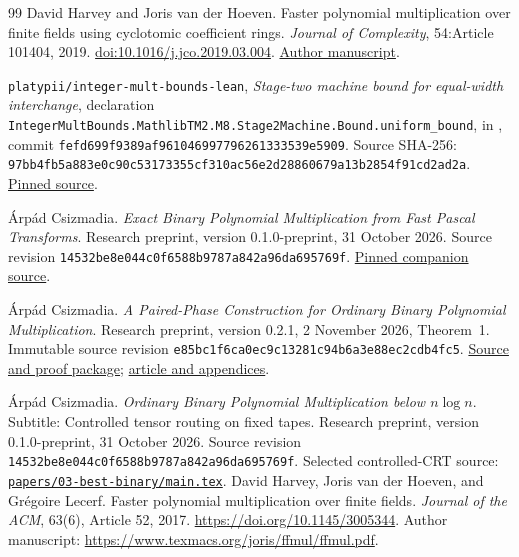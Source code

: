 \documentclass[11pt]{article}
\theoremstyle{definition}
\begin{document}
\begingroup
\small
\raggedright
\begin{thebibliography}{99}
\setlength{\itemsep}{1.5pt}
\setlength{\parsep}{0pt}
David Harvey and Joris van der Hoeven.
\newblock Faster polynomial multiplication over finite fields using
cyclotomic coefficient rings.
\newblock \emph{Journal of Complexity}, 54:Article 101404, 2019.
\newblock \href{https://doi.org/10.1016/j.jco.2019.03.004}{doi:10.1016/j.jco.2019.03.004}.
\newblock \href{https://www.texmacs.org/joris/cyclomult/cyclomult.pdf}{Author manuscript}.

\newblock \texttt{platypii/integer-mult-bounds-lean},
\emph{Stage-two machine bound for equal-width interchange}, declaration
\texttt{IntegerMultBounds.MathlibTM2.M8.Stage2Machine.Bound.uniform\_bound},
in ,
commit \texttt{fefd699f9389af961046997796261333539e5909}.
\newblock Source SHA-256: \texttt{97bb4fb5a883e0c90c53173355cf310ac56e2d28860679a13b2854f91cd2ad2a}.
\newblock \href{https://github.com/platypii/integer-mult-bounds-lean/blob/fefd699f9389af961046997796261333539e5909/IntegerMultBounds/MathlibTM2/M8/Stage2Machine/Bound.lean}{Pinned source}.

\'Arp\'ad Csizmadia.
\newblock \emph{Exact Binary Polynomial Multiplication from Fast Pascal Transforms}.
\newblock Research preprint, version 0.1.0-preprint, 31 October 2026.
Source revision \texttt{14532be8e044c0f6588b9787a842a96da695769f}.
\newblock \href{https://github.com/arpcs/finite-field-polynomial-multiplication/tree/14532be8e044c0f6588b9787a842a96da695769f/papers/02-simple-binary}{Pinned companion source}.

\'Arp\'ad Csizmadia.
\newblock \emph{A Paired-Phase Construction for Ordinary Binary Polynomial Multiplication}.
\newblock Research preprint, version 0.2.1, 2 November 2026, Theorem~1.
\newblock Immutable source revision
\texttt{e85bc1f6ca0ec9c13281c94b6a3e88ec2cdb4fc5}.
\newblock \href{https://github.com/arpcs/finite-field-polynomial-multiplication/tree/e85bc1f6ca0ec9c13281c94b6a3e88ec2cdb4fc5/papers/03-best-binary/versions/0.2.1}{Source and proof package};
\href{https://github.com/arpcs/finite-field-polynomial-multiplication/blob/e85bc1f6ca0ec9c13281c94b6a3e88ec2cdb4fc5/papers/03-best-binary/versions/0.2.1/paper.pdf}{article and appendices}.

\'Arp\'ad Csizmadia.
\newblock \emph{Ordinary Binary Polynomial Multiplication below $n\log n$}.
\newblock Subtitle: Controlled tensor routing on fixed tapes.
\newblock Research preprint, version 0.1.0-preprint, 31 October 2026.
Source revision \texttt{14532be8e044c0f6588b9787a842a96da695769f}.
\newblock Selected controlled-CRT source:
\href{../03-best-binary/main.tex}{\texttt{papers/03-best-binary/main.tex}}.
David Harvey, Joris van der Hoeven, and Gr\'egoire Lecerf.
\newblock Faster polynomial multiplication over finite fields.
\newblock \emph{Journal of the ACM}, 63(6), Article 52, 2017.
\newblock \url{https://doi.org/10.1145/3005344}.
\newblock Author manuscript: \url{https://www.texmacs.org/joris/ffmul/ffmul.pdf}.


\end{thebibliography}
\end{document}
